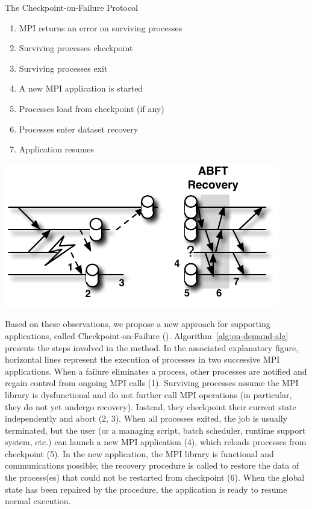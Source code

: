 \begin{algorithm}
\caption{The Checkpoint-on-Failure Protocol}
\label{alg:on-demand-alg}\label{fig:idea}
\centering
\begin{minipage}[b]{.55\linewidth}
	\begin{enumerate}\sffamily\small
		\item MPI returns an error on surviving processes 
		\item Surviving processes checkpoint
		\item Surviving processes exit
		\item A new MPI application is started
		\item Processes load from checkpoint (if any)
		\item Processes enter \abft dataset recovery
		\item Application resumes
	\end{enumerate}
\end{minipage}
\hfill
\begin{minipage}[b]{.39\linewidth}
\includegraphics[width=\linewidth]{figures/idea.pdf}
\end{minipage}
\end{algorithm}

Based on these observations, we propose a new approach for supporting
\abft applications, called Checkpoint-on-Failure (\cof).
Algorithm~\ref{alg:on-demand-alg} presents the steps involved in the
\cof method. In the associated explanatory figure, horizontal lines
represent the execution of processes in two successive MPI applications.
When a failure eliminates a process, other processes are notified and
regain control from ongoing MPI calls (1). Surviving processes assume
the MPI library is dysfunctional and do not further call MPI operations
(in particular, they do not yet undergo \abft recovery). Instead, they
checkpoint their current state independently and abort (2, 3). When
all processes exited, the job is usually terminated, but the user (or a
managing script, batch scheduler, runtime support system, etc.) can
launch a new MPI application (4), which reloads processes from
checkpoint (5). In the new application, the MPI library is functional
and communications possible; the \abft recovery procedure is called to
restore the data of the process(es) that could not be restarted from
checkpoint (6). When the global state has been repaired by the \abft
procedure, the application is ready to resume normal execution.

